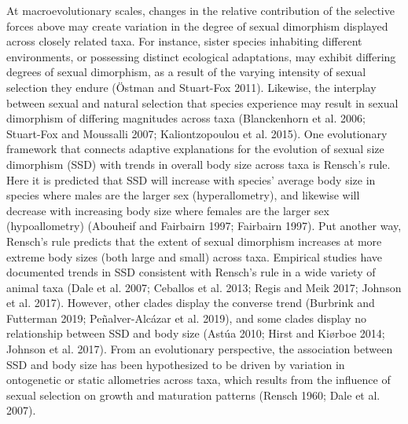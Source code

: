 \documentclass[]{article}
\begin{document}
At macroevolutionary scales, changes in the relative contribution of the
selective forces above may create variation in the degree of sexual
dimorphism displayed across closely related taxa. For instance, sister
species inhabiting different environments, or possessing distinct
ecological adaptations, may exhibit differing degrees of sexual
dimorphism, as a result of the varying intensity of sexual selection
they endure (Östman and Stuart-Fox 2011). Likewise, the interplay
between sexual and natural selection that species experience may result
in sexual dimorphism of differing magnitudes across taxa (Blanckenhorn
et al. 2006; Stuart-Fox and Moussalli 2007; Kaliontzopoulou et al.
2015). One evolutionary framework that connects adaptive explanations
for the evolution of sexual size dimorphism (SSD) with trends in overall
body size across taxa is Rensch's rule. Here it is predicted that SSD
will increase with species' average body size in species where males are
the larger sex (hyperallometry), and likewise will decrease with
increasing body size where females are the larger sex (hypoallometry)
(Abouheif and Fairbairn 1997; Fairbairn 1997). Put another way, Rensch's
rule predicts that the extent of sexual dimorphism increases at more
extreme body sizes (both large and small) across taxa. Empirical studies
have documented trends in SSD consistent with Rensch's rule in a wide
variety of animal taxa (Dale et al. 2007; Ceballos et al. 2013; Regis
and Meik 2017; Johnson et al. 2017). However, other clades display the
converse trend (Burbrink and Futterman 2019; Peñalver-Alcázar et al.
2019), and some clades display no relationship between SSD and body size
(Astúa 2010; Hirst and Kiørboe 2014; Johnson et al. 2017). From an
evolutionary perspective, the association between SSD and body size has
been hypothesized to be driven by variation in ontogenetic or static
allometries across taxa, which results from the influence of sexual
selection on growth and maturation patterns (Rensch 1960; Dale et al.
2007). \hfill\break
\end{document}
